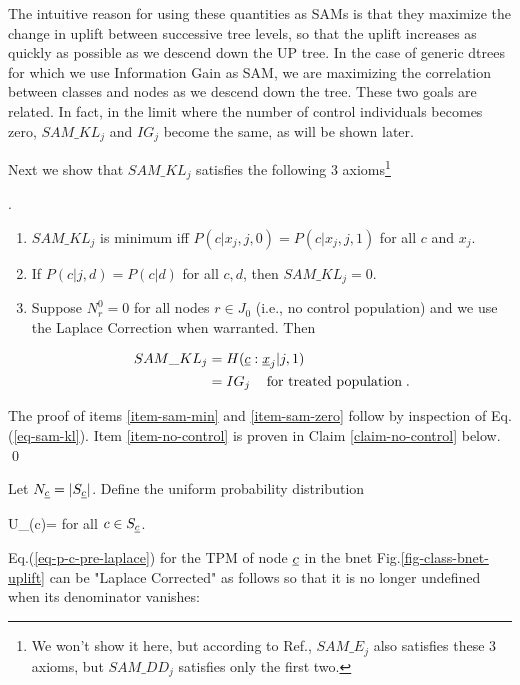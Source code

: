 The intuitive reason for
 using these quantities as
SAMs is that they maximize the change in uplift 
between 
successive tree levels, so 
that the uplift increases as quickly as possible
as we descend down the UP tree.
In the case of generic dtrees
for which we use Information Gain as SAM, we 
are maximizing the correlation
between classes and nodes as we descend down the tree. 
These two goals are related.
In fact, in the limit
where the
number of control individuals
becomes zero,
$SAM\_KL_j$ and $IG_j$
become the same, as will be shown later.

Next we show
that $SAM\_KL_j$
satisfies the following 3
axioms\footnote{
We won't show it
here, but 
according to Ref.\cite{jaros},
$SAM\_E_j$ also satisfies these
3 axioms, but
$SAM\_DD_j$
satisfies only the first two.}

\begin{claim}
.\newline
\begin{enumerate}
\item \label{item-sam-min}
$SAM\_KL_j$ 
is minimum
iff 
$P(c|x_j,j,0)=P(c|x_j, j,1)$ 
for all $c$ and $x_j$.
\item \label{item-sam-zero}
If $P(c|j,d)=P(c|d)$
for all $c,d$, then $SAM\_KL_j=0$.
\item
\label{item-no-control}
Suppose $N^0_r=0$ for all nodes $r\in J_0$
 (i.e., no control population)
and we use the Laplace Correction
when warranted. Then

\begin{align}
SAM\_KL_j
&=
H({\underline{c}}:{\underline{x}}_j|j,1)
\\
&=
IG_j\;\;\; \text{ for treated population}
\;.
\end{align}
\end{enumerate}
\end{claim}
\proof

The proof of items
\ref{item-sam-min}
and \ref{item-sam-zero}
follow by inspection of Eq.(\ref{eq-sam-kl}).
Item \ref{item-no-control}
is proven in Claim \ref{claim-no-control}
below.
\qed



Let $N_{\underline{c}}=|S_{\underline{c}}|$.
Define the uniform probability 
distribution 

\beq
U_\rvc(c)=
\eeq
for all $c\in S_{\underline{c}}$.

Eq.(\ref{eq-p-c-pre-laplace})
for the TPM of node
${\underline{c}}$ in the bnet Fig.\ref{fig-class-bnet-uplift} can be
"Laplace Corrected"
as follows
so that it is no longer
undefined when
its denominator vanishes:

